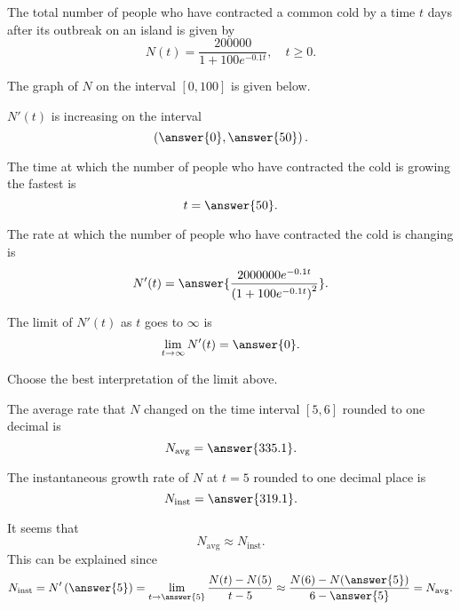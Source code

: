 \documentclass{ximera}
\author{Nela Lakos \and Kyle Parsons}
\begin{document}
	\begin{exercise}
		
		The total number of people who have contracted a common cold by a time $t$ days after its outbreak on an island is given by
		\[
		N(t) = \frac{200000}{1+100e^{-0.1t}},\quad t\geq0.
		\]
		
		The graph of $N$ on the interval $[0,100]$ is given below.
		
		\begin{image}
		\end{image}
		
		$N'(t)$ is increasing on the interval
		\[
		\left(\answer{0},\answer{50}\right).
		\]
		
		The time at which the number of people who have contracted the cold is growing the fastest is
		\[
		t = \answer{50}.
		\]
		
		The rate at which the number of people who have contracted the cold is changing is
		\[
		N'(t) = \answer{\frac{2000000e^{-0.1t}}{\left(1+100e^{-0.1t}\right)^2}}.
		\]
		
		The limit of $N'(t)$ as $t$ goes to $\infty$ is
		\[
		\lim_{t\to\infty}N'(t) = \answer{0}.
		\]
		
		Choose the best interpretation of the limit above.
		\begin{multipleChoice}
		\end{multipleChoice}
		
		The average rate that $N$ changed on the time interval $[5,6]$ rounded to one decimal is
		\[
		N_{\text{avg}} = \answer{335.1}.
		\]
		
		The instantaneous growth rate of $N$ at $t=5$ rounded to one decimal place is
		\[
		N_{\text{inst}} = \answer{319.1}.
		\]
		
		It seems that 
		\[
		N_{\text{avg}}\approx N_{\text{inst}}.
		\]
		This can be explained since
		\[
		N_{\text{inst}} = N'\left(\answer{5}\right) = \lim_{t\to\answer{5}}\frac{N(t)-N(5)}{t-5} \approx \frac{N(6) - N(\answer{5})}{6-\answer{5}} = N_{\text{avg}}.
		\]
		
	\end{exercise}
\end{document}
